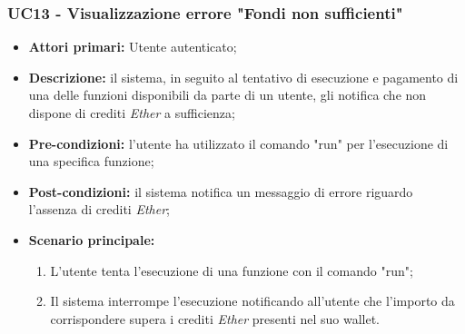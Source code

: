 \subsubsection{UC13 - Visualizzazione errore "Fondi non sufficienti"}
\begin{itemize}
	\item \textbf{Attori primari:} Utente autenticato;
	\item \textbf{Descrizione:} il sistema, in seguito al tentativo di esecuzione e pagamento di una delle funzioni disponibili da parte di un utente, gli notifica che non dispone di crediti \textit{Ether\glo} a sufficienza; 
	\item \textbf{Pre-condizioni:} l'utente ha utilizzato il comando "run" per l'esecuzione di una specifica funzione;
	\item \textbf{Post-condizioni:} il sistema notifica un messaggio di errore riguardo l'assenza di crediti \textit{Ether\glos};
	\item \textbf{Scenario principale:} 
	\begin{enumerate}
		\item L'utente tenta l'esecuzione di una funzione con il comando "run";
		\item Il sistema interrompe l'esecuzione notificando all'utente che l'importo da corrispondere supera i crediti \textit{Ether\glo} presenti nel suo wallet.
	\end{enumerate}
\end{itemize}